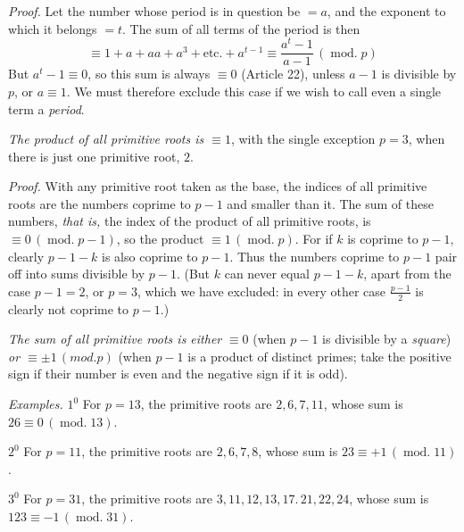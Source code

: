 \emph{Proof.} Let the number whose period is in question be $=a$, and the exponent to which it belongs $=t$. The sum of all terms of the period is then
\[\equiv1+a+aa+a^3+\text{etc.}+a^{t-1}\equiv\frac{a^t-1}{a-1}\,(\operatorname{mod.}p)\]
But $a^t-1\equiv0$, so this sum is always $\equiv0$ (Article 22), unless $a-1$ is divisible by $p$, or $a\equiv1$. We must therefore exclude this case if we wish to call even a single term a \emph{period}.

\emph{The product of all primitive roots is $\equiv1$}, with the single exception $p=3$, when there is just one primitive root, $2$.

\emph{Proof.} With any primitive root taken as the base, the indices of all primitive roots are the numbers coprime to $p-1$ and smaller than it. The sum of these numbers, \emph{that is,} the index of the product of all primitive roots, is $\equiv0\,(\operatorname{mod.}p-1)$, so the product $\equiv1\,(\operatorname{mod.}p)$. For if $k$ is coprime to $p-1$, clearly $p-1-k$ is also coprime to $p-1$. Thus the numbers coprime to $p-1$ pair off into sums divisible by $p-1$. (But $k$ can never equal $p-1-k$, apart from the case $p-1=2$, or $p=3$, which we have excluded: in every other case $\frac{p-1}{2}$ is clearly not coprime to $p-1$.)

\emph{The sum of all primitive roots is either} $\equiv0$ (when $p-1$ is divisible by a \emph{square}) \emph{or $\equiv\pm1\,(\mathit{mod.}p)$} (when $p-1$ is a product of distinct primes; take the positive sign if their number is even and the negative sign if it is odd).

\emph{Examples.} $1^0$ For $p=13$, the primitive roots are $2,6,7,11$, whose sum is $26\equiv0\,(\operatorname{mod.}13)$.

$2^0$ For $p=11$, the primitive roots are $2,6,7,8$, whose sum is $23\equiv+1\,(\operatorname{mod.}11)$.

$3^0$ For $p=31$, the primitive roots are $3,11,12,13,17.\,21,22,24$, whose sum is $123\equiv-1\,(\operatorname{mod.}31)$.

